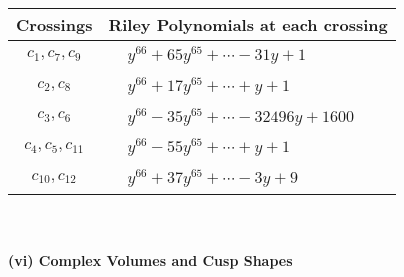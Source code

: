 \documentclass[1p]{elsarticle_modified}
\theoremstyle{definition}
\begin{document}
\begin{tabular}{m{50pt}|m{274pt}}
Crossings & \hspace{64pt}Riley Polynomials at each crossing \\
\hline $$\begin{aligned}c_{1},c_{7},c_{9}\end{aligned}$$&$\begin{aligned}
&y^{66}+65 y^{65}+\cdots-31 y+1
\end{aligned}$\\
\hline $$\begin{aligned}c_{2},c_{8}\end{aligned}$$&$\begin{aligned}
&y^{66}+17 y^{65}+\cdots+y+1
\end{aligned}$\\
\hline $$\begin{aligned}c_{3},c_{6}\end{aligned}$$&$\begin{aligned}
&y^{66}-35 y^{65}+\cdots-32496 y+1600
\end{aligned}$\\
\hline $$\begin{aligned}c_{4},c_{5},c_{11}\end{aligned}$$&$\begin{aligned}
&y^{66}-55 y^{65}+\cdots+y+1
\end{aligned}$\\
\hline $$\begin{aligned}c_{10},c_{12}\end{aligned}$$&$\begin{aligned}
&y^{66}+37 y^{65}+\cdots-3 y+9
\end{aligned}$\\
\hline
\end{tabular}\\~\\
\newpage\flushleft \textbf{(vi) Complex Volumes and Cusp Shapes}
\end{document}
